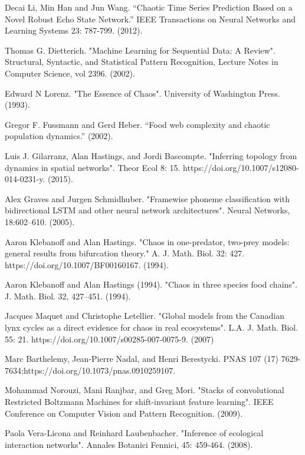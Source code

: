 \documentclass[letterpaper, 10 pt, conference]{ieeeconf}  %
\begin{document}
\begin{thebibliography}{99}

Decai Li, Min Han and Jun Wang. “Chaotic Time Series Prediction Based on a Novel Robust Echo State Network.” IEEE Transactions on Neural Networks and Learning Systems 23: 787-799. (2012).

 Thomas G. Dietterich. "Machine Learning for Sequential Data: A Review". Structural, Syntactic, and Statistical Pattern Recognition, Lecture Notes in Computer Science, vol 2396. (2002).

 Edward N Lorenz. "The Essence of Chaos". University of Washington Press. (1993).

 Gregor F. Fussmann and Gerd Heber. “Food web complexity and chaotic population dynamics.” (2002).

 Luis J. Gilarranz, Alan Hastings, and Jordi Bascompte. "Inferring topology from dynamics in spatial networks". Theor Ecol 8: 15. https://doi.org/10.1007/s12080-014-0231-y. (2015).

 Alex Graves and Jurgen Schmidhuber. "Framewise phoneme classification with bidirectional LSTM and other neural network architectures". Neural Networks, 18:602–610. (2005).

 Aaron Klebanoff and Alan Hastings. "Chaos in one-predator, two-prey models: general results from bifurcation theory." A. J. Math. Biol. 32: 427. https://doi.org/10.1007/BF00160167. (1994).

Aaron Klebanoff and Alan Hastings (1994). "Chaos in three species food chains". J. Math. Biol. 32, 427–451. (1994).

 Jacques Maquet and Christophe Letellier. "Global models from the Canadian lynx cycles as a direct evidence for chaos in real ecosystems".  L.A. J. Math. Biol. 55: 21. https://doi.org/10.1007/s00285-007-0075-9. (2007)

 Marc Barthelemy, Jean-Pierre Nadal, and Henri Berestycki. PNAS 107 (17) 7629-7634;https://doi.org/10.1073/pnas.0910259107. 

 Mohammad Norouzi, Mani Ranjbar, and Greg Mori. "Stacks of convolutional Restricted Boltzmann Machines for shift-invariant feature learning". IEEE Conference on Computer Vision and Pattern Recognition. (2009).

 Paola Vera-Licona and Reinhard Laubenbacher. "Inference of ecological interaction networks". Annales Botanici Fennici, 45: 459-464. (2008).


\end{thebibliography}
\end{document}
